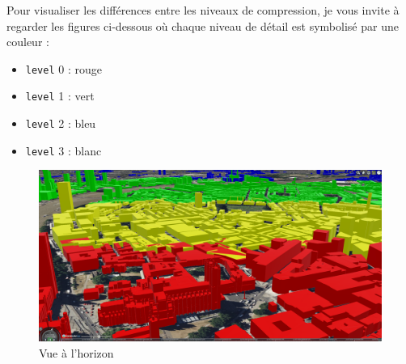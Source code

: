 Pour visualiser les différences entre les niveaux de compression, je vous invite à regarder les figures ci-dessous où chaque niveau de détail est symbolisé par une couleur :

\begin{itemize}
    \item \texttt{level} 0 : rouge
    \item \texttt{level} 1 : vert
    \item \texttt{level} 2 : bleu
    \item \texttt{level} 3 : blanc
\end{itemize}


\begin{figure}[H]
    \centering
    \includegraphics[width=1\textwidth]{assets/figures/lods-horizon.png}
    \caption{Vue à l'horizon}
    \label{fig:lods-horizon}
\end{figure}

